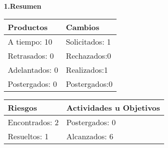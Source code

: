 \documentclass[12pt]{report}
\numberwithin{equation}{section}
\begin{document}
\begin{flushleft}

\textbf{1.Resumen}\\

\begin{table}[H]
\centering
\begin{tabular}{|m{5cm}|m{5cm}|}
\hline
\textbf{Productos} & \textbf{Cambios}\\
\hline \hline
\small{A tiempo:  10}&\small{ Solicitados: 1}\\
\hline
\small{Retrasados: 0}& \small{Rechazados:0}\\
\hline
\small{Adelantados: 0}& \small{Realizados:1}\\
\hline
\small{Postergados: 0}& \small{Postergados:0}\\
\hline
\end{tabular}
\end{table}

\begin{table}[H]
\centering
\begin{tabular}{|m{5cm}|m{5cm}|}
\hline
\textbf{Riesgos} & \textbf{Actividades u Objetivos}\\
\hline \hline
\small{Encontrados: 2}& \small{Postergados: 0}\\
\hline
\small{Resueltos: 1} & \small{Alcanzados: 6}\\
\hline
\end{tabular}
\label{tabla: TABLA CE ResumenCierre}
\end{table}

\end{flushleft}
\end{document}
